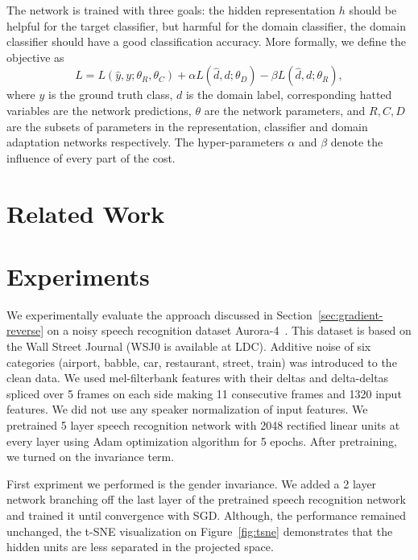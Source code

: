 \documentclass{article}
\begin{document}
    The network is trained with three goals: the hidden representation $h$ should
    be helpful for the target classifier, but harmful for the domain classifier,
    the domain classifier should have a good classification accuracy. More 
    formally, we define the objective as
    \begin{equation}
        L = L(\hat{y}, y; \theta_R, \theta_C) + 
        \alpha L(\hat{d}, d; \theta_D) -
        \beta L(\hat{d}, d; \theta_R),
    \end{equation}
    where $y$ is the ground truth class, $d$ is the domain label, corresponding
    hatted variables are the network predictions, $\theta$ are the network 
    parameters, and $R, C, D$ are the subsets of parameters in the representation,
    classifier and domain adaptation networks respectively. The hyper-parameters
    $\alpha$ and $\beta$ denote the influence of every part of the cost.

\section{Related Work}

\section{Experiments}
We experimentally evaluate the approach discussed in Section~\ref{sec:gradient-reverse} 
on a noisy speech recognition dataset Aurora-4~\cite{parihar2002aurora}. This dataset
is based on the Wall Street Journal (WSJ0 is available at LDC). Additive noise of 
six categories (airport, babble, car, restaurant, street, train) was introduced to the 
clean data. We used mel-filterbank features with their deltas and delta-deltas spliced
over 5 frames on each side making 11 consecutive frames and 1320 input features. 
We did not use any speaker normalization of input features. We pretrained 5 layer
speech recognition network with 2048 rectified linear units at every layer using Adam 
optimization algorithm for 5 epochs. After pretraining, we turned on the invariance term.

First expriment we performed is the gender invariance. We added a 2 layer network 
branching off the last layer of the pretrained speech recognition network and 
trained it until convergence with SGD. Although, the performance remained unchanged,
the t-SNE visualization on Figure~\ref{fig:tsne} demonstrates that the hidden units
are less separated in the projected space.
\end{document}
